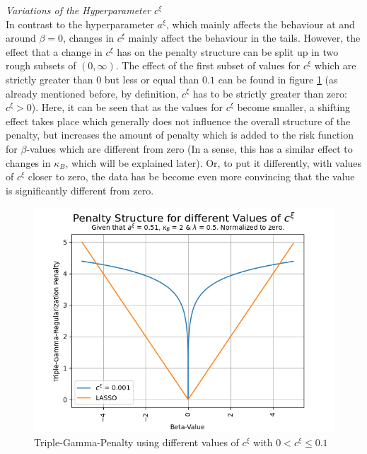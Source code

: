 \documentclass[12pt,a4paper]{article}
\begin{document}
\textit{Variations of the Hyperparameter $c^\xi$}\\

In contrast to the hyperparameter $a^\xi$, which mainly affects the behaviour at and around $\beta=0$, changes in $c^\xi$ mainly affect the behaviour in the tails. However, the effect that a change in $c^\xi$ has on the penalty structure can be split up in two rough subsets of $(0,\infty)$. The effect of the first subset of values for $c^\xi$ which are strictly greater than $0$ but less or equal than $0.1$ can be found in figure \ref{fig:ChangeInC_SmallValues} (as already mentioned before, by definition, $c^\xi$ has to be strictly greater than zero: $c^\xi > 0$). Here, it can be seen that as the values for $c^\xi$ become smaller, a shifting effect takes place which generally does not influence the overall structure of the penalty, but increases the amount of penalty which is added to the risk function for $\beta$-values which are different from zero (In a sense, this has a similar effect to changes in $\kappa_B$, which will be explained later). Or, to put it differently, with values of $c^\xi$ closer to zero, the data has be become even more convincing that the value is significantly different from zero.\\


\begin{figure}[!h]
\centering
\includegraphics[scale=0.75]{../02_simulation/021_simulation_figures/TGPenalty_ChangeInC_Part2.png}
\caption{Triple-Gamma-Penalty using different values of $c^\xi$ with $0 < c^\xi \leq 0.1$}
\label{fig:ChangeInC_SmallValues}
\end{figure}
\end{document}
